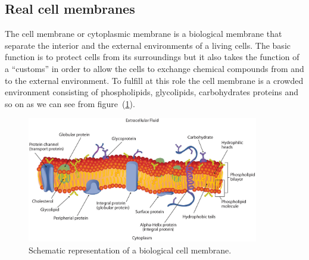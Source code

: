 \subsection{Real cell membranes}
The cell membrane or cytoplasmic membrane is a biological membrane that separate the interior and the external environments of a living cells. The basic function is to protect cells from its surroundings but it also takes the function of a ``customs'' in order to allow the cells to exchange chemical compounds from and to the external environment. To fulfill at this role the cell membrane is a crowded environment consisting of phospholipids, glycolipids, carbohydrates proteins and so on as we can see from figure~(\ref{fig:cellMembrane}).
\begin{figure}[!ht]
	\centering
	\includegraphics[width=0.9\textwidth]{./img/cellMembrane}
	\caption{Schematic representation of a biological cell membrane.}
	\label{fig:cellMembrane}
\end{figure}

